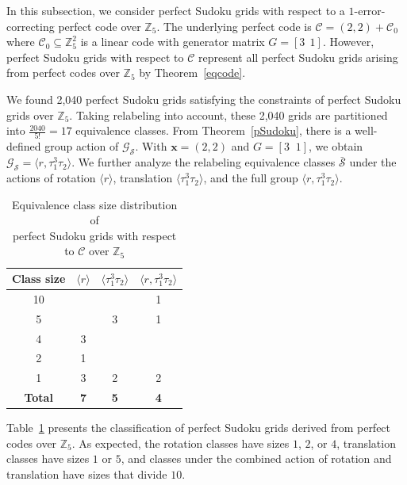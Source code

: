 \documentclass{article}
\theoremstyle{definition}
\begin{document}
In this subsection, we consider perfect Sudoku grids with respect to a $1$-error-correcting perfect code over $\mathbb{Z}_5$. The underlying perfect code is $\mathcal{C}=(2, 2) + \mathcal{C}_0$ where $\mathcal{C}_0\subseteq\mathbb{Z}_5^2$ is a linear code with generator matrix $G=[3~~1]$. However, perfect Sudoku grids with respect to $\mathcal{C}$ represent all perfect Sudoku grids arising from perfect codes over $\mathbb{Z}_5$ by Theorem~\ref{eqcode}.

We found 2,040 perfect Sudoku grids satisfying the constraints of perfect Sudoku grids over $\mathbb{Z}_5$. Taking relabeling into account, these 2,040 grids are partitioned into $\frac{2040}{5!} = 17$ equivalence classes. From Theorem~\ref{pSudoku}, there is a well-defined group action of $\mathcal{G}_\mathcal{S}$. With $\mathbf{x}=(2, 2)$ and $G=[3 \;\; 1]$, we obtain $\mathcal{G}_\mathcal{S}=\langle r, \tau_1^3\tau_2\rangle$. We further analyze the relabeling equivalence classes $\bar{\mathcal{S}}$ under the actions of rotation $\langle r \rangle$, translation $\langle \tau_1^3\tau_2 \rangle$, and the full group $\langle r, \tau_1^3\tau_2\rangle$.

\begin{table}[ht]
\centering
\renewcommand{\arraystretch}{1.4}
\begin{tabular}{|c|c|c|c|}
\hline
\textbf{Class size} & $\langle r \rangle$ & $\langle \tau_1^3\tau_2\rangle$ & $\langle r, \tau_1^3\tau_2\rangle$ \\
\hline
10 &  &  & 1 \\
5  &  & 3  & 1 \\
4  & 3  &  &  \\
2  & 1  &  &  \\
1  & 3  & 2  & 2 \\
\hline
\textbf{Total} & \textbf{7} & \textbf{5} & \textbf{4} \\
\hline
\end{tabular}
\caption{Equivalence class size distribution of \\perfect Sudoku grids with respect to $\mathcal{C}$ over $\mathbb{Z}_5$}
\label{tab:5x5-equiv-summary}
\end{table}

Table~\ref{tab:5x5-equiv-summary} presents the classification of perfect Sudoku grids derived from perfect codes over $\mathbb{Z}_5$. As expected, the rotation classes have sizes $1$, $2$, or $4$, translation classes have sizes $1$ or $5$, and classes under the combined action of rotation and translation have sizes that divide $10$.
\end{document}
